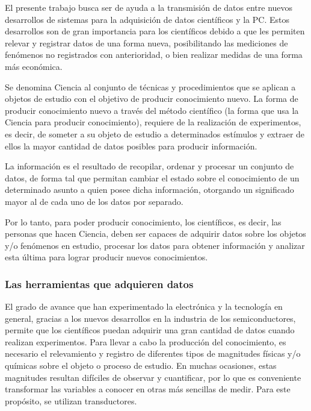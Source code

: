 
El presente trabajo busca ser de ayuda a la transmisión de datos entre nuevos desarrollos de sistemas para la adquisición de datos científicos y la PC. Estos desarrollos son de gran importancia para los científicos debido a que les permiten relevar y registrar datos de una forma nueva, posibilitando las mediciones de fenómenos no registrados con anterioridad, o bien realizar medidas de una forma más económica.

Se denomina Ciencia al conjunto de técnicas y procedimientos que se aplican a objetos de estudio con el objetivo de producir conocimiento nuevo.
La forma de producir conocimiento nuevo a través del método científico (la forma que usa la Ciencia para producir conocimiento), requiere de la realización de experimentos, es decir, de someter a su objeto de estudio a determinados estímulos y extraer de ellos la mayor cantidad de datos posibles para producir información.

La información es el resultado de recopilar, ordenar y procesar un conjunto de datos, de forma tal que permitan cambiar el estado sobre el conocimiento de un determinado asunto a quien posee dicha información, otorgando un significado mayor al de cada uno de los datos por separado.

Por lo tanto, para poder producir conocimiento, los científicos, es decir, las personas que hacen Ciencia, deben ser capaces de adquirir datos sobre los objetos y/o fenómenos en estudio, procesar los datos para obtener información y analizar esta última para lograr producir nuevos conocimientos.

\subsubsection{Las herramientas que adquieren datos}
El grado de avance que han experimentado la electrónica y la tecnología en general, gracias a los nuevos desarrollos en la industria de los semiconductores, permite que los científicos puedan adquirir una gran cantidad de datos cuando realizan experimentos. Para llevar a cabo la producción del conocimiento, es necesario el relevamiento y registro de diferentes tipos de magnitudes físicas y/o químicas sobre el objeto o proceso de estudio. En muchas ocasiones, estas magnitudes resultan difíciles de observar y cuantificar, por lo que es conveniente transformar las variables a conocer en otras más sencillas de medir. Para este propósito, se utilizan transductores.%

